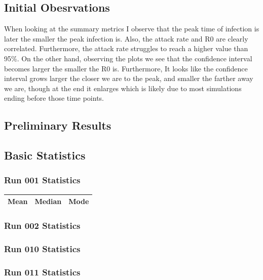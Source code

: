 \documentclass{article}
\begin{document}
\subsection{Initial Obesrvations}
When looking at the summary metrics I observe that the peak time of infection is later the smaller the peak infection is. Also, the attack rate and R0 are clearly correlated. Furthermore, the attack rate struggles to reach a higher value than 95\%.
\newline
On the other hand, observing the plots we see that the confidence interval becomes larger the smaller the R0 is. Furthermore, It looks like the confidence interval grows larger the closer we are to the peak, and smaller the farther away we are, though at the end it enlarges which is likely due to most simulations ending before those time points.
\subsection{Preliminary Results}

\subsection{Basic Statistics}
\subsubsection{Run 001 Statistics}
\begin{tabular}{| l | l | l |}
  \hline
  Mean & Median & Mode \\
  \hline\hline
\end{tabular} 
\subsubsection{Run 002 Statistics}
\subsubsection{Run 010 Statistics}
\subsubsection{Run 011 Statistics}

\printbibliography
\end{document}
